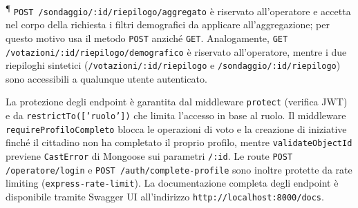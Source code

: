 \documentclass[12pt, a4paper]{article}
\begin{document}
\noindent\textsuperscript{¶} \texttt{POST /sondaggio/:id/riepilogo/aggregato} è riservato
all'operatore e accetta nel corpo della richiesta i filtri demografici da applicare
all'aggregazione; per questo motivo usa il metodo \texttt{POST} anziché \texttt{GET}.
Analogamente, \texttt{GET /votazioni/:id/riepilogo/demografico} è riservato all'operatore, mentre
i due riepiloghi sintetici (\texttt{/votazioni/:id/riepilogo} e \texttt{/sondaggio/:id/riepilogo})
sono accessibili a qualunque utente autenticato.

\vspace{0.5cm}

\noindent La protezione degli endpoint è garantita dal middleware \texttt{protect} (verifica JWT)
e da \texttt{restrictTo(['ruolo'])} che limita l'accesso in base al ruolo. Il middleware
\texttt{requireProfiloCompleto} blocca le operazioni di voto e la creazione di iniziative finché il
cittadino non ha completato il proprio profilo, mentre \texttt{validateObjectId} previene
\texttt{CastError} di Mongoose sui parametri \texttt{/:id}. Le route \texttt{POST /operatore/login}
e \texttt{POST /auth/complete-profile} sono inoltre protette da rate limiting
(\texttt{express-rate-limit}).
La documentazione completa degli endpoint è disponibile tramite Swagger UI all'indirizzo
\texttt{http://localhost:8000/docs}.
\end{document}
